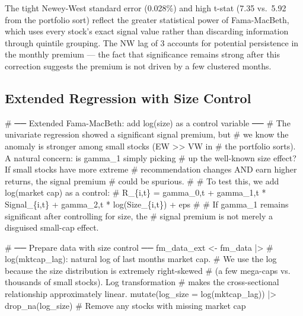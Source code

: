 \documentclass[
  letterpaper,
  DIV=11,
  numbers=noendperiod]{scrartcl}
\newenvironment{Shaded}{\begin{snugshade}}{\end{snugshade}}
\newcommand{\AttributeTok}[1]{\textcolor[rgb]{0.40,0.45,0.13}{#1}}
\newcommand{\CommentTok}[1]{\textcolor[rgb]{0.37,0.37,0.37}{#1}}
\newcommand{\FunctionTok}[1]{\textcolor[rgb]{0.28,0.35,0.67}{#1}}
\newcommand{\NormalTok}[1]{\textcolor[rgb]{0.00,0.23,0.31}{#1}}
\newcommand{\OtherTok}[1]{\textcolor[rgb]{0.00,0.23,0.31}{#1}}
\newcommand{\SpecialCharTok}[1]{\textcolor[rgb]{0.37,0.37,0.37}{#1}}
\begin{document}
The tight Newey-West standard error (0.028\%) and high t-stat (7.35
vs.~5.92 from the portfolio sort) reflect the greater statistical power
of Fama-MacBeth, which uses every stock's exact signal value rather than
discarding information through quintile grouping. The NW lag of 3
accounts for potential persistence in the monthly premium --- the fact
that significance remains strong after this correction suggests the
premium is not driven by a few clustered months.

\subsection{Extended Regression with Size
Control}\label{extended-regression-with-size-control}

\begin{Shaded}
\begin{Highlighting}[]
\CommentTok{\# ── Extended Fama{-}MacBeth: add log(size) as a control variable ──}
\CommentTok{\# The univariate regression showed a significant signal premium, but}
\CommentTok{\# we know the anomaly is stronger among small stocks (EW \textgreater{}\textgreater{} VW in}
\CommentTok{\# the portfolio sorts). A natural concern: is gamma\_1 simply picking}
\CommentTok{\# up the well{-}known size effect? If small stocks have more extreme}
\CommentTok{\# recommendation changes AND earn higher returns, the signal premium}
\CommentTok{\# could be spurious.}
\CommentTok{\#}
\CommentTok{\# To test this, we add log(market cap) as a control:}
\CommentTok{\#   R\_\{i,t\} = gamma\_0,t + gamma\_1,t * Signal\_\{i,t\} + gamma\_2,t * log(Size\_\{i,t\}) + eps}
\CommentTok{\#}
\CommentTok{\# If gamma\_1 remains significant after controlling for size, the}
\CommentTok{\# signal premium is not merely a disguised small{-}cap effect.}

\CommentTok{\# ── Prepare data with size control ──}
\NormalTok{fm\_data\_ext }\OtherTok{\textless{}{-}}\NormalTok{ fm\_data }\SpecialCharTok{|\textgreater{}}
  \CommentTok{\# log(mktcap\_lag): natural log of last month\textquotesingle{}s market cap.}
  \CommentTok{\# We use the log because the size distribution is extremely right{-}skewed}
  \CommentTok{\# (a few mega{-}caps vs. thousands of small stocks). Log transformation}
  \CommentTok{\# makes the cross{-}sectional relationship approximately linear.}
  \FunctionTok{mutate}\NormalTok{(}\AttributeTok{log\_size =} \FunctionTok{log}\NormalTok{(mktcap\_lag)) }\SpecialCharTok{|\textgreater{}}
  \FunctionTok{drop\_na}\NormalTok{(log\_size)  }\CommentTok{\# Remove any stocks with missing market cap}


\end{Highlighting}
\end{Shaded}
\end{document}
